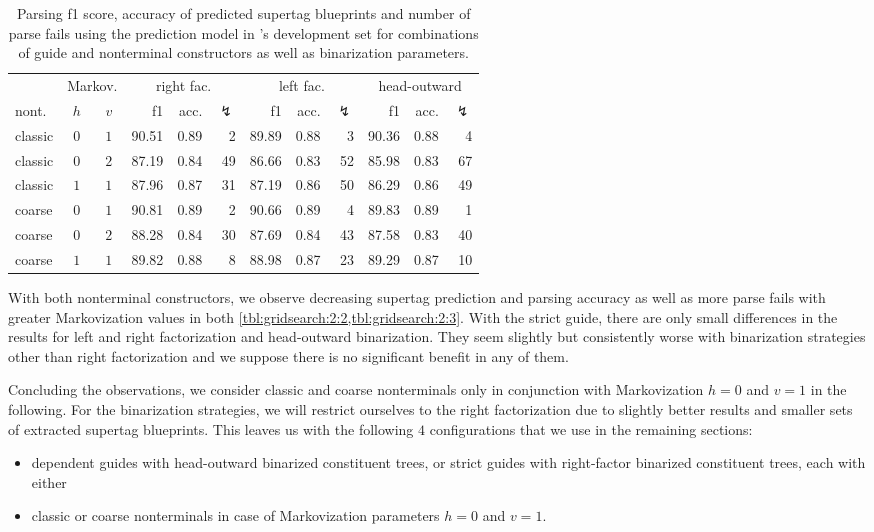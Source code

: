 \documentclass[../../document.tex]{subfiles}
\begin{document}
    \begin{table}
        \caption{\label{tbl:gridsearch:2:3}
        Parsing f1 score, accuracy of predicted supertag blueprints and number of parse fails using the  prediction model in \negra{}'s development set for combinations of guide and nonterminal constructors as well as binarization parameters.
        }
        \centering
        \vspace{.2cm}
        \begin{tabular}{lcc|rrr|rrr|rrr}
            \toprule
& \multicolumn{2}{c|}{Markov.}         & \multicolumn{3}{c|}{right fac.} & \multicolumn{3}{c|}{left fac.} & \multicolumn{3}{c}{head-outward} \\
nont.  & \(h\) &\(v\) & f1 & acc. & $\lightning$ & f1 & acc. & $\lightning$ & f1 & acc. & $\lightning$  \\ \hline
classic & \(0\) & \(1\) & 90.51 & 0.89 &  2 & 89.89 & 0.88 &  3 & 90.36 & 0.88 &  4 \\
classic & \(0\) & \(2\) & 87.19 & 0.84 & 49 & 86.66 & 0.83 & 52 & 85.98 & 0.83 & 67 \\
classic & \(1\) & \(1\) & 87.96 & 0.87 & 31 & 87.19 & 0.86 & 50 & 86.29 & 0.86 & 49 \\\hline
coarse  & \(0\) & \(1\) & 90.81 & 0.89 &  2 & 90.66 & 0.89 &  4 & 89.83 & 0.89 &  1 \\
coarse  & \(0\) & \(2\) & 88.28 & 0.84 & 30 & 87.69 & 0.84 & 43 & 87.58 & 0.83 & 40 \\
coarse  & \(1\) & \(1\) & 89.82 & 0.88 &  8 & 88.98 & 0.87 & 23 & 89.29 & 0.87 & 10 \\
\bottomrule
        \end{tabular}
    \end{table}

    With both nonterminal constructors, we observe decreasing supertag prediction and parsing accuracy as well as more parse fails with greater Markovization values in both \cref{tbl:gridsearch:2:2,tbl:gridsearch:2:3}.
    With the strict guide, there are only small differences in the results for left and right factorization and head-outward binarization.
    They seem slightly but consistently worse with binarization strategies other than right factorization and we suppose there is no significant benefit in any of them.

    Concluding the observations, we consider classic and coarse nonterminals only in conjunction with Markovization \(h=0\) and \(v=1\) in the following.
    For the binarization strategies, we will restrict ourselves to the right factorization due to slightly better results and smaller sets of extracted supertag blueprints.
    This leaves us with the following \(4\) configurations that we use in the remaining sections:
    \begin{itemize}
        \item dependent guides with head-outward binarized constituent trees, or strict guides with right-factor binarized constituent trees, each with either
        \item classic or coarse nonterminals in case of Markovization parameters \(h=0\) and \(v=1\).
    \end{itemize}
\end{document}
